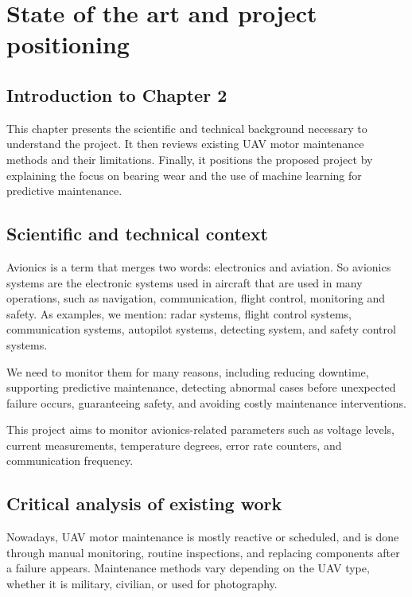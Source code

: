 \chapter{State of the art and project positioning}

\section*{Introduction to Chapter 2}

This chapter presents the scientific and technical background necessary to understand the project. It then reviews existing UAV motor maintenance methods and their limitations. Finally, it positions the proposed project by explaining the focus on bearing wear and the use of machine learning for predictive maintenance.

\section{Scientific and technical context}

Avionics is a term that merges two words: electronics and aviation. So avionics systems are the electronic systems used in aircraft that are used in many operations, such as navigation, communication, flight control, monitoring and safety. As examples, we mention: radar systems, flight control systems, communication systems, autopilot systems, detecting system, and safety control systems.

We need to monitor them for many reasons, including reducing downtime, supporting predictive maintenance, detecting abnormal cases before unexpected failure occurs, guaranteeing safety, and avoiding costly maintenance interventions.

This project aims to monitor avionics-related parameters such as voltage levels, current measurements, temperature degrees, error rate counters, and communication frequency.

\section{Critical analysis of existing work}

Nowadays, UAV motor maintenance is mostly reactive or scheduled, and is done through manual monitoring, routine inspections, and replacing components after a failure appears. Maintenance methods vary depending on the UAV type, whether it is military, civilian, or used for photography.

